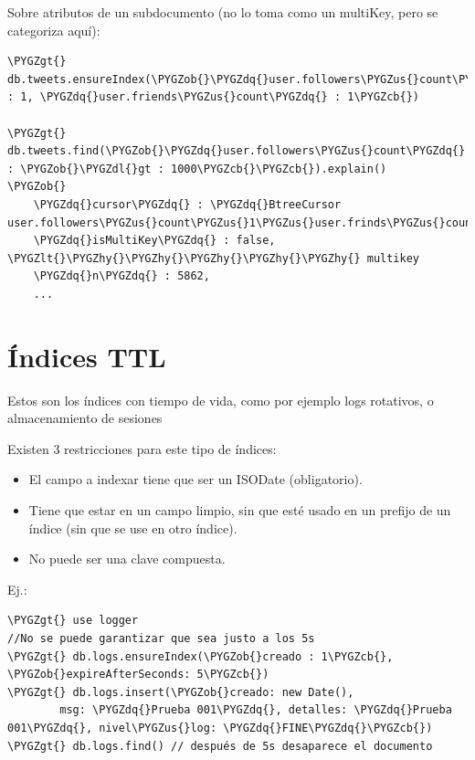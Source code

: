 \documentclass[a4paper,10pt,english]{sphinxmanual}
\def\PYGZus{\char`\_}
\def\PYGZob{\char`\{}
\def\PYGZcb{\char`\}}
\def\PYGZlt{\char`\<}
\def\PYGZgt{\char`\>}
\def\PYGZdl{\char`\$}
\def\PYGZhy{\char`\-}
\def\PYGZdq{\char`\"}
\begin{document}
Sobre atributos de un subdocumento (no lo toma como un multiKey, pero se categoriza aquí):

\begin{Verbatim}[commandchars=\\\{\}]
\PYGZgt{} db.tweets.ensureIndex(\PYGZob{}\PYGZdq{}user.followers\PYGZus{}count\PYGZdq{} : 1, \PYGZdq{}user.friends\PYGZus{}count\PYGZdq{} : 1\PYGZcb{})

\PYGZgt{} db.tweets.find(\PYGZob{}\PYGZdq{}user.followers\PYGZus{}count\PYGZdq{} : \PYGZob{}\PYGZdl{}gt : 1000\PYGZcb{}\PYGZcb{}).explain()
\PYGZob{}
    \PYGZdq{}cursor\PYGZdq{} : \PYGZdq{}BtreeCursor user.followers\PYGZus{}count\PYGZus{}1\PYGZus{}user.frinds\PYGZus{}count\PYGZus{}1\PYGZdq{},
    \PYGZdq{}isMultiKey\PYGZdq{} : false,  \PYGZlt{}\PYGZhy{}\PYGZhy{}\PYGZhy{}\PYGZhy{}\PYGZhy{} multikey
    \PYGZdq{}n\PYGZdq{} : 5862,
    ...
\end{Verbatim}


\section{Índices TTL}
\label{contents/optimizing:indices-ttl}
Estos son los índices con tiempo de vida, como por ejemplo logs rotativos, o almacenamiento de sesiones

Existen 3 restricciones para este tipo de índices:
\begin{itemize}
\item {} 
El campo a indexar tiene que ser un ISODate (obligatorio).

\item {} 
Tiene que estar en un campo limpio, sin que esté usado en un prefijo de un índice (sin que se use en otro índice).

\item {} 
No puede ser una clave compuesta.

\end{itemize}

Ej.:

\begin{Verbatim}[commandchars=\\\{\}]
\PYGZgt{} use logger
//No se puede garantizar que sea justo a los 5s
\PYGZgt{} db.logs.ensureIndex(\PYGZob{}creado : 1\PYGZcb{}, \PYGZob{}expireAfterSeconds: 5\PYGZcb{})
\PYGZgt{} db.logs.insert(\PYGZob{}creado: new Date(),
        msg: \PYGZdq{}Prueba 001\PYGZdq{}, detalles: \PYGZdq{}Prueba 001\PYGZdq{}, nivel\PYGZus{}log: \PYGZdq{}FINE\PYGZdq{}\PYGZcb{})
\PYGZgt{} db.logs.find() // después de 5s desaparece el documento
\end{Verbatim}
\end{document}
